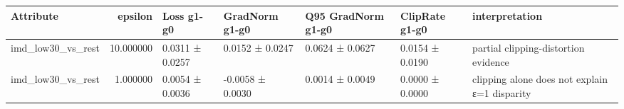 \begin{tabular}{lrlllll}
\toprule
Attribute & epsilon & Loss g1-g0 & GradNorm g1-g0 & Q95 GradNorm g1-g0 & ClipRate g1-g0 & interpretation \\
\midrule
imd_low30_vs_rest & 10.000000 & 0.0311 ± 0.0257 & 0.0152 ± 0.0247 & 0.0624 ± 0.0627 & 0.0154 ± 0.0190 & partial clipping-distortion evidence \\
imd_low30_vs_rest & 1.000000 & 0.0054 ± 0.0036 & -0.0058 ± 0.0030 & 0.0014 ± 0.0049 & 0.0000 ± 0.0000 & clipping alone does not explain ε=1 disparity \\
\bottomrule
\end{tabular}
